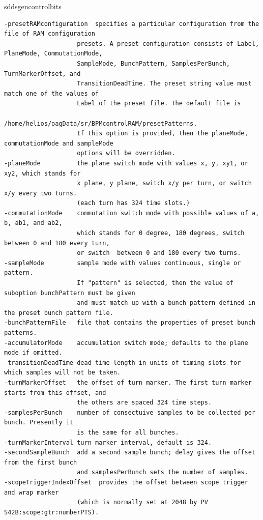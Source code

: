 \begin{sddsprog}{sddsgencontrolbits}
\begin{verbatim}
-presetRAMconfiguration  specifies a particular configuration from the file of RAM configuration 
                    presets. A preset configuration consists of Label, PlaneMode, CommutationMode,
                    SampleMode, BunchPattern, SamplesPerBunch, TurnMarkerOffset, and 
                    TransitionDeadTime. The preset string value must match one of the values of 
                    Label of the preset file. The default file is 
                    /home/helios/oagData/sr/BPMcontrolRAM/presetPatterns.
                    If this option is provided, then the planeMode, commutationMode and sampleMode
                    options will be overridden.
-planeMode          the plane switch mode with values x, y, xy1, or xy2, which stands for
                    x plane, y plane, switch x/y per turn, or switch x/y every two turns.
                    (each turn has 324 time slots.)
-commutationMode    commutation switch mode with possible values of a, b, ab1, and ab2,
                    which stands for 0 degree, 180 degrees, switch between 0 and 180 every turn,
                    or switch  between 0 and 180 every two turns.
-sampleMode         sample mode with values continuous, single or pattern.
                    If "pattern" is selected, then the value of suboption bunchPattern must be given
                    and must match up with a bunch pattern defined in the preset bunch pattern file.
-bunchPatternFile   file that contains the properties of preset bunch patterns.
-accumulatorMode    accumulation switch mode; defaults to the plane mode if omitted.
-transitionDeadTime dead time length in units of timing slots for which samples will not be taken.
-turnMarkerOffset   the offset of turn marker. The first turn marker starts from this offset, and
                    the others are spaced 324 time steps.
-samplesPerBunch    number of consectuive samples to be collected per bunch. Presently it
                    is the same for all bunches.
-turnMarkerInterval turn marker interval, default is 324.
-secondSampleBunch  add a second sample bunch; delay gives the offset from the first bunch
                    and samplesPerBunch sets the number of samples.
-scopeTriggerIndexOffset  provides the offset between scope trigger and wrap marker
                    (which is normally set at 2048 by PV S42B:scope:gtr:numberPTS).


\end{verbatim}
\end{sddsprog}
